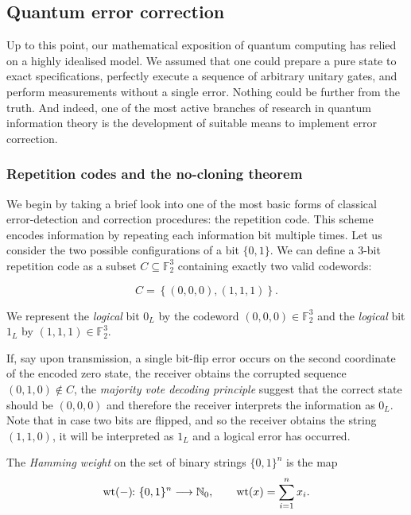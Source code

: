 \documentclass[a4paper, oneside, 12pt]{amsart}
\begin{document}
\subsection{Quantum error correction}\label{sec:quantum-error-correction}
Up to this point, our mathematical exposition of quantum computing has relied on a highly idealised model.
We assumed that one could prepare a pure state to exact specifications, perfectly execute a sequence of arbitrary unitary gates, and perform measurements without a single error.
Nothing could be further from the truth.
And indeed, one of the most active branches of research in quantum information theory is the development of suitable means to implement error correction.

\subsubsection{Repetition codes and the no-cloning theorem}\label{sec:repetition-codes}

We begin by taking a brief look into one of the most basic forms of classical error-detection and correction procedures: the repetition code.
This scheme encodes information by repeating each information bit multiple times.
Let us consider the two possible configurations of a bit \(\{0,1\}\).
We can define a \(3\)-bit repetition code as a subset \(C \subseteq \mathbb{F}_{2}^{3}\) containing exactly two valid codewords:

\begin{equation*}
  C = \left\{ (0,0,0), (1,1,1) \right\}.
\end{equation*}

We represent the \emph{logical} bit \(0_L\) by the codeword \((0,0,0) \in \mathbb{F}_{2}^{3}\) and the \emph{logical} bit \(1_L\) by \((1,1,1) \in \mathbb{F}_{2}^{3}\).

If, say upon transmission, a single bit-flip error occurs on the second coordinate of the encoded zero state, the receiver obtains the corrupted sequence \((0,1,0) \notin C\), the \emph{majority vote decoding principle} suggest that the correct state should be \((0,0,0)\) and therefore the receiver interprets the information as \(0_{L}\).
Note that in case two bits are flipped, and so the receiver obtains \eg the string \((1,1,0)\), it will be interpreted as \(1_{L}\) and a logical error has occurred.

The \emph{Hamming weight} on the set of binary strings \(\{0,1\}^{n}\) is the map
\begin{equation}\label{eq:hamming-weight}
  \operatorname{wt}(\blank) \from \{0,1\}^{n} \to \mathbb{N}_{0}, \qquad \operatorname{wt}(x) = \sum_{i=1}^{n} x_{i}.
\end{equation}
\end{document}
